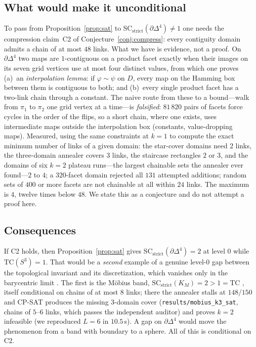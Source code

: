 \documentclass[12pt]{article}
\newcommand{\TC}{\mathrm{TC}}
\newcommand{\SC}{\mathrm{SC}}
\newcommand{\SCst}{\SC_{\mathrm{strict}}}
\begin{document}
\subsection{What would make it unconditional}

To pass from Proposition~\ref{prop:sat} to $\SCst(\partial\Delta^4)\ne1$
one needs the compression claim~C2 of Conjecture~\ref{conj:compress}:
every contiguity domain admits a chain of at most $48$ links.  What we
have is evidence, not a proof.  On $\partial\Delta^4$ two maps are
$1$-contiguous on a product facet exactly when their images on its seven
grid vertices use at most four distinct values, from which one proves
(a)~an \emph{interpolation lemma}: if $\varphi\sim\psi$ on $D$, every
map on the Hamming box between them is contiguous to both; and
(b)~every single product facet has a two-link chain through a constant.
The naive route from these to a bound---walk from $\pi_1$ to $\pi_2$
one grid vertex at a time---is \emph{falsified}: $81\,820$ pairs of
facets force cycles in the order of the flips, so a short chain, where
one exists, uses intermediate maps outside the interpolation box
(constants, value-dropping maps).  Measured, using the same constraints
at $k=1$ to compute the exact minimum number of links of a given domain:
the star-cover domains need $2$ links, the three-domain annealer covers
$3$ links, the staircase rectangles $2$ or $3$, and the domains of
six $k=2$ plateau runs---the largest chainable sets the annealer ever
found---$2$ to $4$; a $320$-facet domain rejected all $131$ attempted
additions; random sets of $400$ or more facets are not chainable at all
within $24$ links.  The maximum is $4$, twelve times below $48$.  We
state this as a conjecture and do not attempt a proof here.

\subsection{Consequences}

If C2 holds, then Proposition~\ref{prop:sat} gives
$\SCst(\partial\Delta^4)=2$ at level $0$ while $\TC(S^3)=1$.  That would
be a \emph{second} example of a genuine level-$0$ gap between the
topological invariant and its discretization, which vanishes only in the
barycentric limit \cite{G18}.  The first is the M\"obius band,
$\SCst(K_M)=2>1=\TC$ \cite{PM26}, itself conditional on chains of at
most $8$ links; there the annealer stalls at $148/150$ and CP-SAT
produces the missing $3$-domain cover (\texttt{results/mobius\_k3\_sat},
chains of $5$--$6$ links, which passes the independent auditor) and
proves $k=2$ infeasible (we reproduced $L=6$ in $10.5$\,s).  A gap on
$\partial\Delta^4$ would move the phenomenon from a band with boundary to
a sphere.  All of this is conditional on C2.
\end{document}
